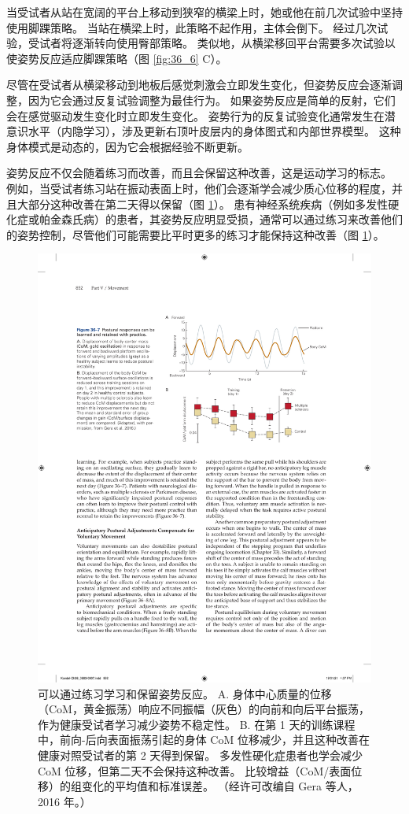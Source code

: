 当受试者从站在宽阔的平台上移动到狭窄的横梁上时，她或他在前几次试验中坚持使用脚踝策略。
当站在横梁上时，此策略不起作用，主体会倒下。
经过几次试验，受试者将逐渐转向使用臀部策略。
类似地，从横梁移回平台需要多次试验以使姿势反应适应脚踝策略（图 \ref{fig:36_6} C）。


尽管在受试者从横梁移动到地板后感觉刺激会立即发生变化，但姿势反应会逐渐调整，因为它会通过反复试验调整为最佳行为。
如果姿势反应是简单的反射，它们会在感觉驱动发生变化时立即发生变化。
姿势行为的反复试验变化通常发生在潜意识水平（内隐学习），涉及更新右顶叶皮层内的身体图式和内部世界模型。
这种身体模式是动态的，因为它会根据经验不断更新。


姿势反应不仅会随着练习而改善，而且会保留这种改善，这是运动学习的标志。
例如，当受试者练习站在振动表面上时，他们会逐渐学会减少质心位移的程度，并且大部分这种改善在第二天得以保留（图 \ref{fig:36_7}）。
患有神经系统疾病（例如多发性硬化症或帕金森氏病）的患者，其姿势反应明显受损，通常可以通过练习来改善他们的姿势控制，尽管他们可能需要比平时更多的练习才能保持这种改善（图 \ref{fig:36_7}）。


\begin{figure}[htbp]
	\centering
	\includegraphics[width=0.7\linewidth]{chap36/fig_36_7}
	\caption{可以通过练习学习和保留姿势反应。 A. 身体中心质量的位移（CoM，黄金振荡）响应不同振幅（灰色）的向前和向后平台振荡，作为健康受试者学习减少姿势不稳定性。 B. 在第 1 天的训练课程中，前向-后向表面振荡引起的身体 CoM 位移减少，并且这种改善在健康对照受试者的第 2 天得到保留。 多发性硬化症患者也学会减少 CoM 位移，但第二天不会保持这种改善。 比较增益（CoM/表面位移）的组变化的平均值和标准误差。 （经许可改编自 Gera 等人，2016 年。）}
	\label{fig:36_7}
\end{figure}


